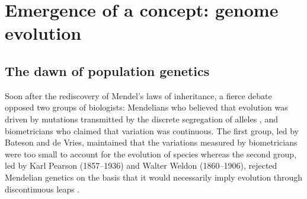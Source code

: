 

%


\section{Emergence of a concept: genome evolution}

\subsection{The dawn of population genetics}

Soon after the rediscovery of Mendel's laws of inheritance, a fierce debate opposed two groups of biologists: Mendelians who believed that evolution was driven by mutations transmitted by the discrete segregation of alleles \citep{bowler2003evolution}, and biometricians who claimed that variation was continuous.
The first group, led by Bateson and de Vries, maintained that the variations measured by biometricians were too small to account for the evolution of species whereas the second group, led by Karl Pearson (1857--1936) and Walter Weldon (1860--1906), rejected Mendelian genetics on the basis that it would necessarily imply evolution through discontinuous leaps \citep{provine2001origins}.

